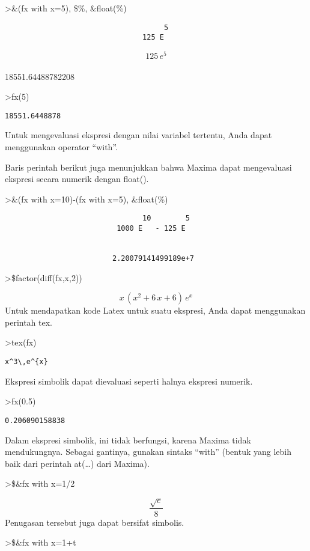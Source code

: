 \documentclass[
]{book}
\begin{document}
\textgreater\&(fx with x=5), \$\%, \&float(\%)

\begin{verbatim}
                                     5
                                125 E
\end{verbatim}

\[125\,e^5\]\\
18551.64488782208

\textgreater fx(5)

\begin{verbatim}
18551.6448878
\end{verbatim}

Untuk mengevaluasi ekspresi dengan nilai variabel tertentu, Anda dapat menggunakan operator ``with''.

Baris perintah berikut juga menunjukkan bahwa Maxima dapat mengevaluasi ekspresi secara numerik dengan float().

\textgreater\&(fx with x=10)-(fx with x=5), \&float(\%)

\begin{verbatim}
                                10        5
                          1000 E   - 125 E


                         2.20079141499189e+7
\end{verbatim}

\textgreater\$factor(diff(fx,x,2))

\[x\,\left(x^2+6\,x+6\right)\,e^{x}\]Untuk mendapatkan kode Latex untuk suatu ekspresi, Anda dapat menggunakan perintah tex.

\textgreater tex(fx)

\begin{verbatim}
x^3\,e^{x}
\end{verbatim}

Ekspresi simbolik dapat dievaluasi seperti halnya ekspresi numerik.

\textgreater fx(0.5)

\begin{verbatim}
0.206090158838
\end{verbatim}

Dalam ekspresi simbolik, ini tidak berfungsi, karena Maxima tidak mendukungnya. Sebagai gantinya, gunakan sintaks ``with'' (bentuk yang lebih baik dari perintah at(\ldots) dari Maxima).

\textgreater\$\&fx with x=1/2

\[\frac{\sqrt{e}}{8}\]Penugasan tersebut juga dapat bersifat simbolis.

\textgreater\$\&fx with x=1+t
\end{document}
